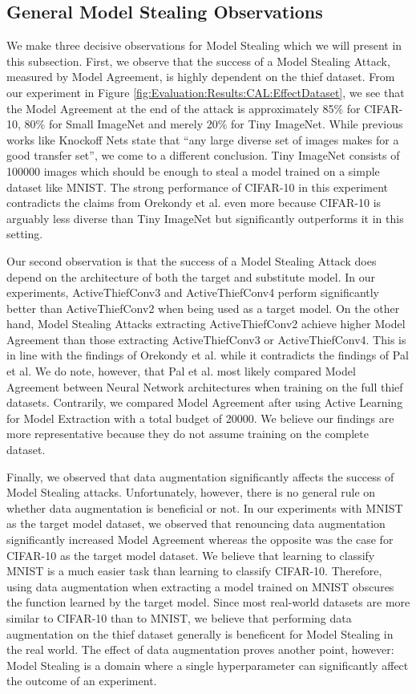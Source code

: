 \subsection{General Model Stealing Observations}
\label{sec:Discussion:ModelStealing:General}
We make three decisive observations for Model Stealing which we will present in this subsection. First, we observe that the success of a Model Stealing Attack, measured
by Model Agreement, is highly dependent on the thief dataset. From our experiment in Figure \ref{fig:Evaluation:Results:CAL:EffectDataset}, we see
that the Model Agreement at the end of the attack is approximately 85\% for CIFAR-10, 80\% for Small ImageNet and merely 20\% for Tiny ImageNet. While previous works like
Knockoff Nets state that \enquote{any large diverse set of images makes for a good transfer set}, we come to a different conclusion. Tiny ImageNet consists of 100000 images
which should be enough to steal a model trained on a simple dataset like MNIST. The strong performance of CIFAR-10 in this experiment contradicts the claims from
Orekondy et al. even more because CIFAR-10 is arguably less diverse than Tiny ImageNet but significantly outperforms it in this setting. \par
Our second observation is that the success of a Model Stealing Attack does depend on the architecture of both the target and substitute model. In our experiments,
ActiveThiefConv3 and ActiveThiefConv4 perform significantly better than ActiveThiefConv2 when being used as a target model. On the other hand, Model Stealing Attacks
extracting ActiveThiefConv2 achieve higher Model Agreement than those extracting ActiveThiefConv3 or ActiveThiefConv4. This is in line with the findings of Orekondy et al. 
while it contradicts the findings of Pal et al. We do note, however, that Pal et al. most likely compared Model Agreement between Neural Network architectures when training
on the full thief datasets. Contrarily, we compared Model Agreement after using Active Learning for Model Extraction with a total budget of 20000. We believe our findings
are more representative because they do not assume training on the complete dataset. \par
Finally, we observed that data augmentation significantly affects the success of Model Stealing attacks. Unfortunately, however, there is no general rule on whether data
augmentation is beneficial or not. In our experiments with MNIST as the target model dataset, we observed that renouncing data augmentation significantly increased Model
Agreement whereas the opposite was the case for CIFAR-10 as the target model dataset. We believe that learning to classify MNIST is a much easier task than learning to classify
CIFAR-10. Therefore, using data augmentation when extracting a model trained on MNIST obscures the function learned by the target model. Since most real-world
datasets are more similar to CIFAR-10 than to MNIST, we believe that performing data augmentation on the thief dataset generally is beneficent for Model Stealing
in the real world. The effect of data augmentation proves another point, however: Model Stealing is a domain where a single hyperparameter can significantly affect
the outcome of an experiment.

